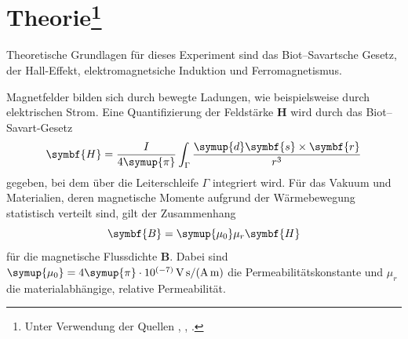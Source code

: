\section{Theorie\footnote{Unter Verwendung der Quellen \cite{demtroeder}, \cite{Versuchsanleitung}, \cite{griffiths}.}}
\label{sec:Theorie}
Theoretische Grundlagen für dieses Experiment sind das Biot--Savartsche Gesetz, der Hall-Effekt, elektromagnetsiche Induktion und Ferromagnetismus.

Magnetfelder bilden sich durch bewegte Ladungen, wie beispielsweise durch elektrischen Strom. %
Eine Quantifizierung der Feldstärke $\symbf{H}$ wird durch das Biot--Savart-Gesetz 
\begin{equation}
\symbf{H}=\frac{I}{4\symup{\pi}}\int_\Gamma \frac{\symup{d}\symbf{s}\times\symbf{r}}{r^3} %
\label{eqn:biotsavart}
\end{equation}
gegeben, bei dem über 
die Leiterschleife $\Gamma$ integriert wird. %
Für das Vakuum und Materialien, deren magnetische Momente aufgrund der Wärmebewegung statistisch verteilt sind, gilt der %
Zusammenhang 
\begin{equation}
\symbf{B}=\symup{\mu_0}\mu_r\symbf{H}
\end{equation}
für die magnetische Flussdichte $\symbf{B}$. 
Dabei sind $\symup{\mu_0}=4\symup{\pi} \cdot 10^{(-7)} \, \si{\volt\second\ampere\tothe{-1}\meter\tothe{-1}}$ die Permeabilitätskonstante 
und $\mu_r$ die materialabhängige, relative Permeabilität. %

